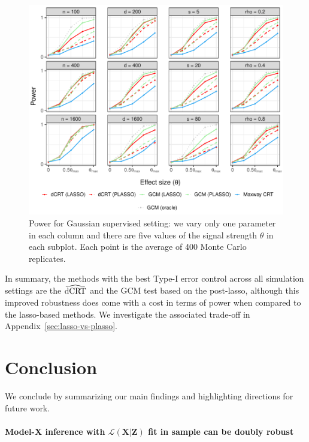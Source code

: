 \documentclass[aos]{imsart}
\theoremstyle{plain}
\theoremstyle{remark}
\newcommand{\prx}{\bm X}								%
\newcommand{\prz}{\bm Z}								%
\newcommand{\law}{\mathcal L}							%
\newcommand{\dCRThat}{\widehat{\textnormal{dCRT}}}		%
\newcommand{\new}[1]{{\color{darkgreen}{#1}}}
\begin{document}
\begin{figure}[h]
    \centering
    \includegraphics[width = \textwidth]{figures/gaussian_supervised_setting_alternative_partial.pdf}
    \caption{Power for Gaussian supervised setting: we vary only one parameter in each column and there are five values of the signal strength $\theta$ in each subplot. Each point is the average of 400 Monte Carlo replicates. \new{All the standard errors are less than 0.026.}}
    \label{fig:gaussian_supervised_partial_alternative}
\end{figure}

In summary, the methods with the best Type-I error control across all simulation settings are the $\dCRThat$ and the GCM test based on the post-lasso, although this improved robustness does come with a cost in terms of power when compared to the lasso-based methods. We investigate the associated trade-off in Appendix~\ref{sec:lasso-vs-plasso}.

\section{Conclusion} \label{sec:conclusion}

We conclude by summarizing our main findings and highlighting directions for future work.

\paragraph*{Model-X inference with $\law(\prx|\prz)$ fit in sample can be doubly robust}
\end{document}
